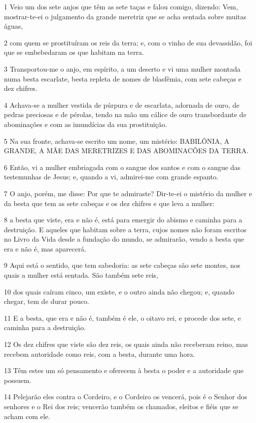 \par 1 Veio um dos sete anjos que têm as sete taças e falou comigo, dizendo: Vem, mostrar-te-ei o julgamento da grande meretriz que se acha sentada sobre muitas águas,
\par 2 com quem se prostituíram os reis da terra; e, com o vinho de sua devassidão, foi que se embebedaram os que habitam na terra.
\par 3 Transportou-me o anjo, em espírito, a um deserto e vi uma mulher montada numa besta escarlate, besta repleta de nomes de blasfêmia, com sete cabeças e dez chifres.
\par 4 Achava-se a mulher vestida de púrpura e de escarlata, adornada de ouro, de pedras preciosas e de pérolas, tendo na mão um cálice de ouro transbordante de abominações e com as imundícias da sua prostituição.
\par 5 Na sua fronte, achava-se escrito um nome, um mistério: BABILÔNIA, A GRANDE, A MÃE DAS MERETRIZES E DAS ABOMINACÕES DA TERRA.
\par 6 Então, vi a mulher embriagada com o sangue dos santos e com o sangue das testemunhas de Jesus; e, quando a vi, admirei-me com grande espanto.
\par 7 O anjo, porém, me disse: Por que te admiraste? Dir-te-ei o mistério da mulher e da besta que tem as sete cabeças e os dez chifres e que leva a mulher:
\par 8 a besta que viste, era e não é, está para emergir do abismo e caminha para a destruição. E aqueles que habitam sobre a terra, cujos nomes não foram escritos no Livro da Vida desde a fundação do mundo, se admirarão, vendo a besta que era e não é, mas aparecerá.
\par 9 Aqui está o sentido, que tem sabedoria: as sete cabeças são sete montes, nos quais a mulher está sentada. São também sete reis,
\par 10 dos quais caíram cinco, um existe, e o outro ainda não chegou; e, quando chegar, tem de durar pouco.
\par 11 E a besta, que era e não é, também é ele, o oitavo rei, e procede dos sete, e caminha para a destruição.
\par 12 Os dez chifres que viste são dez reis, os quais ainda não receberam reino, mas recebem autoridade como reis, com a besta, durante uma hora.
\par 13 Têm estes um só pensamento e oferecem à besta o poder e a autoridade que possuem.
\par 14 Pelejarão eles contra o Cordeiro, e o Cordeiro os vencerá, pois é o Senhor dos senhores e o Rei dos reis; vencerão também os chamados, eleitos e fiéis que se acham com ele.
